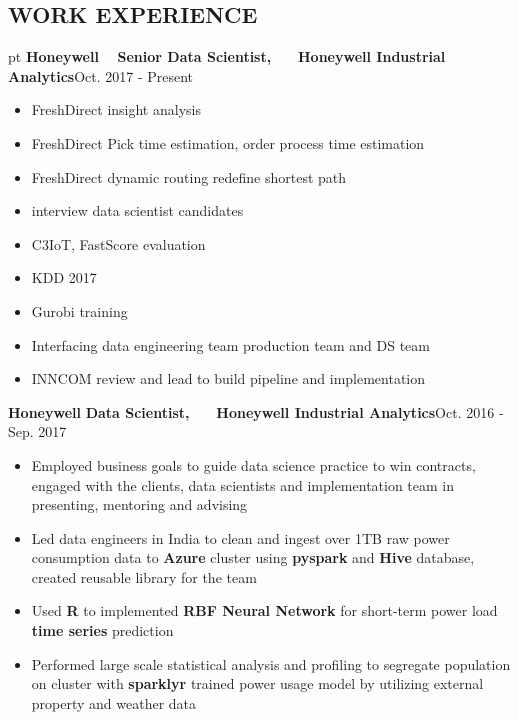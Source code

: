 \documentclass[10.5pt]{res} %
\begin{document}
\begin{resume}
\section{WORK EXPERIENCE}  pt
	\textbf{Honeywell} ~~\textbf{Senior Data Scientist, ~~ Honeywell Industrial Analytics}\hfill Oct. 2017 - Present
		\begin{itemize}
            \item FreshDirect insight analysis
            \item FreshDirect Pick time estimation, order process time estimation
            \item FreshDirect dynamic routing redefine shortest path
            \item interview data scientist candidates
			\item C3IoT, FastScore evaluation
			\item KDD 2017
            \item Gurobi training
			\item Interfacing data engineering team production team and DS team
			\item INNCOM review and lead to build pipeline and implementation
		\end{itemize}\vspace{-\topsep}
	\textbf{Honeywell} \quad\quad\textbf{Data Scientist, ~~ Honeywell Industrial Analytics}\hfill Oct. 2016 - Sep. 2017
		\begin{itemize}
			\item Employed business goals to guide data science practice to win contracts, engaged with the clients, data scientists and implementation team in presenting, mentoring and advising 
			\item Led data engineers in India to clean and ingest over 1TB raw power consumption data to \textbf{Azure} cluster using \textbf{pyspark} and \textbf{Hive} database, created reusable library for the team
			\item Used \textbf{R} to implemented \textbf{RBF Neural Network}  for short-term power load \textbf{time series} prediction     
			\item Performed large scale statistical analysis and profiling to segregate population on cluster with \textbf{sparklyr} trained power usage model by utilizing external property and weather data

\end{itemize}
\end{resume}
\end{document}
